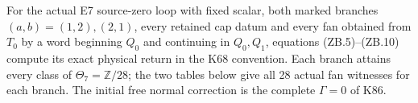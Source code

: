 \begin{theorem}\hypertarget{tag-02W1}{}\label{night:P3K.88}

For the actual E7 source-zero loop with fixed scalar, both marked
branches \((a,b)=(1,2),(2,1)\), every retained cap datum and every fan
obtained from \(T_0\) by a word beginning \(Q_0\) and continuing in
\(Q_0,Q_1\), equations (ZB.5)--(ZB.10) compute its exact physical
return in the K68 convention. Each branch attains every class of
\(\Theta_7=\mathbb Z/28\); the two tables below give all 28 actual
fan witnesses for each branch. The initial free normal correction
is the complete \(\Gamma=0\) of K86.
\end{theorem}

